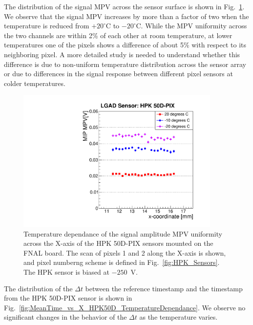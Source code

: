 \documentclass[preprint,1p]{elsarticle}
\begin{document}
The distribution of the signal MPV across the sensor surface is shown in
Fig.~\ref{fig:MPV_vs_X_HPK50D_TemperatureDependance}. We observe that the signal
MPV increases by more than a factor of two when the temperature is reduced 
from $+20^{\circ}$C to $-20^{\circ}$C. While the MPV uniformity across the two
channels are within 2\% of each other at room temperature, at lower temperatures 
one of the pixels shows a difference of about 5\% with respect to its neighboring pixel.
A more detailed study is needed to understand whether this difference is due to
non-uniform temperature distribution across the sensor array or due to differences 
in the signal response between different pixel sensors at colder temperatures.

\begin{figure}[htbp] 
\centering
\includegraphics[width=0.9\textwidth]{figs/FNAL_MPV_vs_X_HPK50D_TemperatureDependance.pdf} 
\caption{Temperature dependance of the signal amplitude MPV uniformity across
the X-axis of the HPK 50D-PIX sensors mounted on the FNAL board. The scan of
pixels 1 and 2 along the X-axis is shown, and pixel numberng scheme is defined
in Fig.~\ref{fig:HPK_Sensors}. The HPK sensor is biased at $-250$~V.} 
\label{fig:MPV_vs_X_HPK50D_TemperatureDependance} 
\end{figure} 

The distribution of the $\Delta t$ between the reference timestamp and the timestamp
from the HPK 50D-PIX sensor is shown in
Fig.~\ref{fig:MeanTime_vs_X_HPK50D_TemperatureDependance}. We observe no
significant changes in the behavior of the $\Delta t$ as the temperature varies. 
\end{document}
